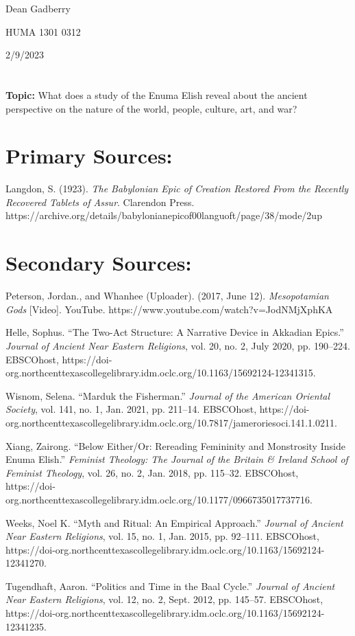 \documentclass[12pt,a4paper,english]{article}
\begin{document}
\sloppy
Dean Gadberry
\par
HUMA 1301 0312
\par
2/9/2023

\section*{}
\textbf{Topic:}
What does a study of the Enuma Elish reveal about the ancient perspective on the nature of the world, people, culture, art, and war?

\section*{Primary Sources:}
\begin{hangparas}{2em}{1}
  Langdon, S. (1923). \emph{The Babylonian Epic of Creation Restored From the Recently Recovered Tablets of Assur}. Clarendon Press. https://archive.org/details/babylonianepicof00languoft/page/38/mode/2up
  \par
\end{hangparas}
\hfill

\section*{Secondary Sources:}
\begin{hangparas}{2em}{1}
  Peterson, Jordan., and Whanhee (Uploader). (2017, June 12). \emph{Mesopotamian Gods} [Video]. YouTube. https://www.youtube.com/watch?v=JodNMjXphKA
  \par
  Helle, Sophus. “The Two-Act Structure: A Narrative Device in Akkadian Epics.” \emph{Journal of Ancient Near Eastern Religions}, vol. 20, no. 2, July 2020, pp. 190–224. EBSCOhost, https://doi-org.northcenttexascollegelibrary.idm.oclc.org/10.1163/15692124-12341315.
  \par
Wisnom, Selena. “Marduk the Fisherman.” \emph{Journal of the American Oriental Society}, vol. 141, no. 1, Jan. 2021, pp. 211–14. EBSCOhost, https://doi-org.northcenttexascollegelibrary.idm.oclc.org/10.7817/jameroriesoci.141.1.0211.
  \par
  Xiang, Zairong. “Below Either/Or: Rereading Femininity and Monstrosity Inside Enuma Elish.” \emph{Feminist Theology: The Journal of the Britain & Ireland School of Feminist Theology}, vol. 26, no. 2, Jan. 2018, pp. 115–32. EBSCOhost, https://doi-org.northcenttexascollegelibrary.idm.oclc.org/10.1177/0966735017737716.
  \par
  Weeks, Noel K. “Myth and Ritual: An Empirical Approach.” \emph{Journal of Ancient Near Eastern Religions}, vol. 15, no. 1, Jan. 2015, pp. 92–111. EBSCOhost, https://doi-org.northcenttexascollegelibrary.idm.oclc.org/10.1163/15692124-12341270.
  \par
Tugendhaft, Aaron. “Politics and Time in the Baal Cycle.” \emph{Journal of Ancient Near Eastern Religions}, vol. 12, no. 2, Sept. 2012, pp. 145–57. EBSCOhost, https://doi-org.northcenttexascollegelibrary.idm.oclc.org/10.1163/15692124-12341235.
\end{hangparas}
\hfill
\end{document}
